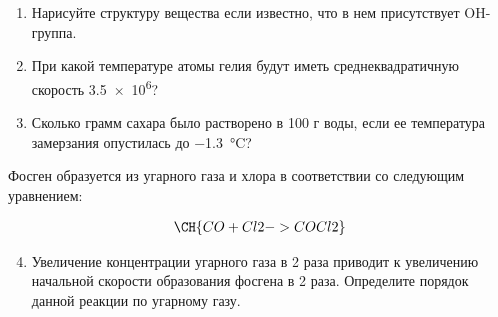 

\begin{enumerate}
    \item Нарисуйте структуру вещества  если известно, что в нем присутствует OH-группа.
    \item При какой температуре атомы гелия будут иметь среднеквадратичную скорость \qty{3.5e6}{\mets}?
    \item Сколько грамм сахара было растворено в 100 г воды, если ее температура замерзания опустилась до \qty{-1.3}{\celsius}?
\end{enumerate}

Фосген образуется из угарного газа и хлора в соответствии со следующим уравнением:

\begin{gather*}
    \CH{CO + Cl2 -> COCl2}
\end{gather*}

\begin{enumerate}
\setcounter{enumi}{3}
    \item Увеличение концентрации угарного газа в 2 раза приводит к увеличению начальной скорости образования фосгена в 2 раза. Определите порядок данной реакции по угарному газу.
\end{enumerate}